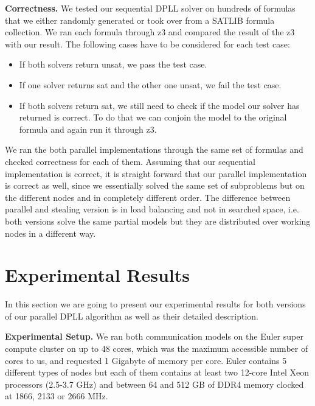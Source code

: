 \documentclass[letterpaper]{article}
\newcommand{\mypar}[1]{{\bf #1.}}
\begin{document}
\mypar{Correctness}
We tested our sequential DPLL solver on hundreds of formulas that we either randomly generated or took over from a SATLIB formula collection. \cite{cnf_website}
We ran each formula through z3 \cite{z3} and compared the result of the z3 with our result.
The following cases have to be considered for each test case:
\begin{itemize}
    \item If both solvers return unsat, we pass the test case.
    \item If one solver returns sat and the other one unsat, we fail the test case.
    \item If both solvers return sat, we still need to check if the model our solver has returned is correct.
        To do that we can conjoin the model to the original formula and again run it through z3.
\end{itemize}

We ran the both parallel implementations through the same set of formulas and checked correctness for each of them.
Assuming that our sequential implementation is correct, it is straight forward that our parallel implementation is correct as well, since we essentially solved the same set of subproblems but on the different nodes and in completely different order. The difference between parallel and stealing version is in load balancing and not in searched space, i.e. both versions solve the same partial models but they are distributed over working nodes in a different way.


\section{Experimental Results}\label{sec:exp}
In this section we are going to present our experimental results for both versions of our parallel DPLL algorithm as well as their detailed description.

\mypar{Experimental Setup}
We ran both communication models on the Euler super compute cluster \cite{euler} on up to 48 cores, which was the maximum accessible number of cores to us, and requested 1 Gigabyte of memory per core. Euler contains 5 different types of nodes but each of them contains at least two 12-core Intel Xeon processors (2.5-3.7 GHz) and between 64 and 512 GB of DDR4 memory clocked at 1866, 2133 or 2666 MHz.
\end{document}
